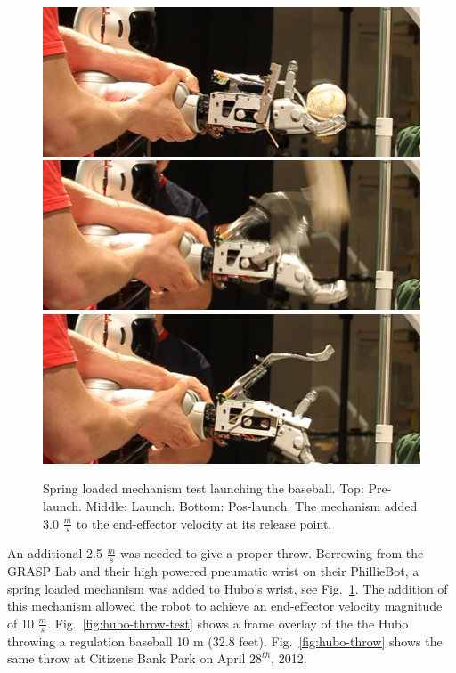 \begin{figure}[t]
  \centering
\includegraphics[width=0.6\columnwidth]{./pix/finalSpring1.png}
\includegraphics[width=0.6\columnwidth]{./pix/finalSpring2.png}
\includegraphics[width=0.6\columnwidth]{./pix/finalSpring3.png}
  \caption{Spring loaded mechanism test launching the baseball.  Top: Pre-launch.  Middle: Launch.  Bottom: Pos-launch.  The mechanism added 3.0 $\frac{m}{s}$ to the end-effector velocity at its release point.}
  \label{fig:hubo-spring}
\end{figure}


An additional 2.5 $\frac{m}{s}$ was needed to give a proper throw.  
Borrowing from the GRASP Lab and their high powered pneumatic wrist on their PhillieBot, a spring loaded mechanism was added to Hubo's wrist, see Fig.~\ref{fig:hubo-spring}.
The addition of this mechanism allowed the robot to achieve an end-effector velocity magnitude of 10 $\frac{m}{s}$.
Fig.~\ref{fig:hubo-throw-test} shows a frame overlay of the the Hubo throwing a regulation baseball 10 m (32.8 feet).
Fig.~\ref{fig:hubo-throw} shows the same throw at Citizens Bank Park on April $28^{th}$, 2012.




